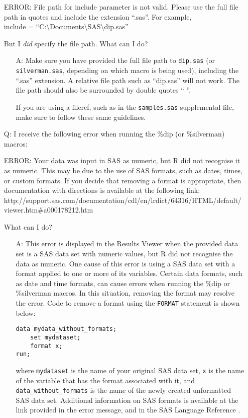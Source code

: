 \documentclass[]{interact}
\theoremstyle{plain}%
\theoremstyle{definition}
\theoremstyle{remark}
\begin{document}
\begin{itemize}
ERROR: File path for include parameter is not valid. Please use the full file path in quotes and include the extension ``.sas''. For example, \\
include = ``C:\textbackslash Documents\textbackslash SAS\textbackslash dip.sas'' 

But I \textit{did} specify the file path. What can I do?
\begin{itemize}
\item[A:] Make sure you have provided the full file path to \texttt{dip.sas} (or \texttt{silverman.sas}, depending on which macro is being used), including the ``.sas'' extension. A relative file path such as ``dip.sas'' will not work. The file path should also be surrounded by double quotes `` ''. 

If you are using a fileref, such as in the \texttt{samples.sas} supplemental file, make sure to follow these same guidelines.
\end{itemize}

\item[Q:]I receive the following error when running the \%dip (or \%silverman) macros:

ERROR: Your data was input in SAS as numeric, but R did not recognise it as numeric. This may be due to the use of SAS formats, such as dates, times, or custom formats. If you decide that removing a format is appropriate, then documentation with directions is available at the following link:
http://support.sas.com/documentation/cdl/en/lrdict/64316/HTML/default/\\viewer.htm\#a000178212.htm

What can I do?

\begin{itemize}
\item[A:] This error is displayed in the Results Viewer when the provided data set is a SAS data set with numeric values, but R did not recognise the data  as numeric. One cause of this error is using a SAS data set with a format applied to one or more of its variables. Certain data formats, such as date and time formats, can cause errors when running the \%dip or \%silverman macros. In this situation, removing the format may resolve the error. Code to remove a format using the \texttt{FORMAT} statement is shown below: 

\begin{verbatim}
data mydata_without_formats;
    set mydataset;
    format x;
run;
\end{verbatim}

where \texttt{mydataset} is the name of your original SAS data set, \texttt{x} is the name of the variable that has the format associated with it, and \texttt{data\_without\_formats} is the name of the newly created unformatted SAS data set. Additional information on SAS formats is available at the link provided in the error message, and in the SAS Language Reference \citep[p.~1579]{sas-languageref}.

\end{itemize}


\end{itemize}
\end{document}
